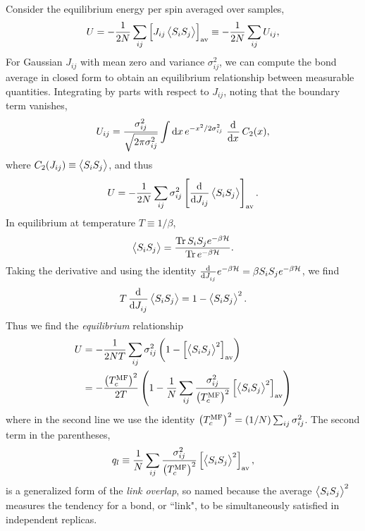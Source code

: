 Consider the equilibrium energy per spin averaged over samples,
\begin{equation}
  U =
  -\frac{1}{2N} \sum_{ij} \left[J_{ij} \left< S_i S_j \right>\right]_{\mathrm{av}} \equiv
  -\frac{1}{2N} \sum_{ij} U_{ij},
\end{equation}
For Gaussian $J_{ij}$ with mean zero and variance $\sigma_{ij}^2$, we can
compute the bond average in closed form to obtain an equilibrium relationship
between measurable quantities. Integrating by parts with respect to $J_{ij}$,
noting that the boundary term vanishes,
\begin{equation}
  U_{ij} =
  \frac{\sigma_{ij}^2}{\sqrt{2 \pi \sigma_{ij}^2}}
    \int \dif x \, e^{-x^2/2\sigma_{ij}^2} \, \dod{}{x} C_2(x),
\end{equation}
where $C_2(J_{ij}) \equiv \left< S_i S_j \right>$, and thus
\begin{equation}
  U = -\frac{1}{2N} \sum_{ij} \sigma_{ij}^2 \dav{\dod{}{J_{ij}} \av{S_i S_j}}.
\end{equation}
In equilibrium at temperature $T \equiv 1/\beta$,
\begin{equation}
  \left< S_i S_j \right> = \frac{\operatorname{Tr} S_i S_j e^{-\beta \mathcal{H}}}{\operatorname{Tr} e^{-\beta \mathcal{H}}}.
\end{equation}
Taking the derivative and using the identity
$\od{}{J_{ij}} e^{-\beta \ham} = \beta S_i S_j e^{-\beta \ham}$,
we find
\begin{equation}
  T \dod{}{J_{ij}} \av{S_i S_j} =
  1 - \av{S_i S_j}^2.
\end{equation}
Thus we find the \emph{equilibrium} relationship
\begin{align}
  U
  &= - \frac{1}{2 N T}
       \sum_{ij}
       \sigma_{ij}^2 \left(1-\left[\left< S_i S_j \right>^2\right]_{\mathrm{av}}\right)\nonumber\\
  &= - \frac{\left(T_c^{\mathrm{MF}}\right)^2}{2T}
       \left(
         1 -
         \frac{1}{N} \sum_{ij}
         \frac{\sigma_{ij}^2}{\left(T_c^{\mathrm{MF}}\right)^2}
         \left[\left< S_i S_j \right>^2\right]_{\mathrm{av}}
       \right)
  \label{eq:equil-1}
\end{align}
where in the second line we use the identity
$\left(T_c^{\mathrm{MF}}\right)^2 = (1/N) \sum_{ij} \sigma_{ij}^2$.
The second term in the parentheses,
\begin{equation}
  q_l \equiv
  \frac{1}{N} \sum_{ij} \frac{\sigma_{ij}^2}{\left(T_c^{\mathrm{MF}}\right)^2} \left[\left< S_i S_j \right>^2\right]_{\mathrm{av}},
\end{equation}
is a generalized form of the \emph{link overlap}, so named because the average
$\left< S_i S_j \right>^2$ measures the tendency for a bond, or ``link", to be
simultaneously satisfied in independent replicas.
